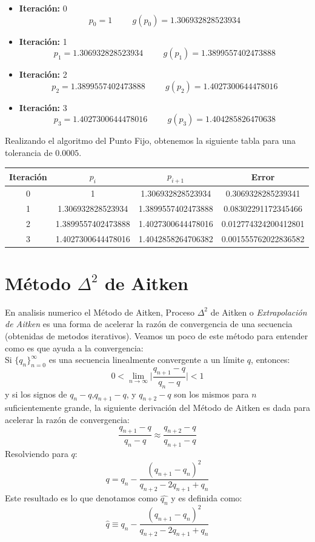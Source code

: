 \documentclass[10pt,letterpaper]{book}
\begin{document}
\begin{itemize}
\item \textbf{Iteración:} 0
$$p_0=1 \hspace{1cm} g(p_0)=1.306932828523934$$
\item \textbf{Iteración:} 1
$$p_1=1.306932828523934 \hspace{1cm} g(p_1)=1.3899557402473888$$
\item \textbf{Iteración:} 2
$$p_2=1.3899557402473888 \hspace{1cm} g(p_2)=1.4027300644478016$$
\item \textbf{Iteración:} 3
$$p_3=1.4027300644478016 \hspace{1cm} g(p_3)=1.404285826470638$$
\end{itemize}

Realizando el algoritmo del Punto Fijo, obtenemos la siguiente tabla para una tolerancia de $0.0005$.
\begin{table}[h]
\centering
\begin{tabular}{|c|c|c|c|}
\hline
Iteración & $p_i$ & $p_{i+1}$ & Error \\
\hline 
0 & 1 & 1.306932828523934 & 0.3069328285239341\\
1 & 1.306932828523934 & 1.3899557402473888 & 0.08302291172345466\\
2 & 1.3899557402473888 & 1.4027300644478016 & 0.012774324200412801\\
3 & 1.4027300644478016 & 1.4042858264706382 & 0.001555762022836582 \\
\hline 
\end{tabular} 
\end{table}
\section*{Método $\Delta^2$ de Aitken}
En analisis numerico el Método de Aitken, Proceso $\Delta^2$ de Aitken o \textit{Extrapolación de Aitken} es una forma de acelerar la razón de convergencia de una secuencia (obtenidas de metodos iterativos). Veamos un poco de este método para entender como es que ayuda a la convergencia:\\
Si $\{ q_n \}_{n=0}^\infty$ es una secuencia linealmente convergente a un límite $q$, entonces:
$$ 0< \lim_{n\rightarrow\infty}\Big| \dfrac{q_{n+1}-q}{q_n-q} \Big| < 1$$
y si los signos de $q_n-q$,$q_{n+1}-q$, y $q_{n+2}-q$ son los mismos para $n$ suficientemente grande, la siguiente derivación del Método de Aitken es dada para acelerar la razón de convergencia:
$$\dfrac{q_{n+1}-q}{q_n-q}\approx\dfrac{q_{n+2}-q}{q_{n+1}-q}$$
Resolviendo para $q$:
$$q=q_n - \dfrac{(q_{n+1}-q_n)^2}{q_{n+2}-2q_{n+1}+q_n}$$
Este resultado es lo que denotamos como $\widehat{q_n}$ y es definida como:
$$\widehat{q}\equiv q_n - \dfrac{(q_{n+1}-q_n)^2}{q_{n+2}-2q_{n+1}+q_n}$$
\end{document}
